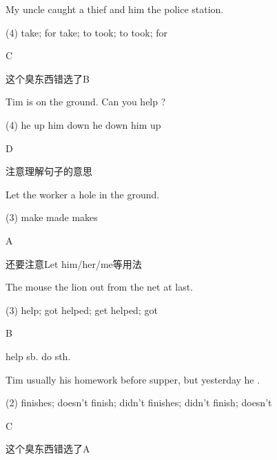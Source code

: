 \begin{question}[tags={xiaoxuect}]
My uncle caught a thief and \blank[width=1cm]{} him \blank[width=1cm]{} the police station.

  \begin{tasks}(4)
    \task take; for
    \task take; to
    \task took; to
    \task took; for
  \end{tasks}
\end{question}
\begin{solution}
C

这个臭东西错选了B
\end{solution}

\begin{question}[tags={xiaoxuect}]
Tim is on the ground. Can you help \blank[width=1cm]{} ?

  \begin{tasks}(4)
    \task he up
    \task him down
    \task he down
    \task him up
  \end{tasks}
\end{question}
\begin{solution}
D

注意理解句子的意思
\end{solution}


\begin{question}[tags={xiaoxuect}]
Let the worker \blank[width=1cm]{} a hole in the ground.

  \begin{tasks}(3)
    \task make
    \task made
    \task makes
  \end{tasks}
\end{question}
\begin{solution}
A

还要注意Let him/her/me等用法
\end{solution}

\begin{question}[tags={xiaoxuect}]
The mouse \blank[width=1cm]{} the lion \blank[width=1cm]{} out from the net at last.

  \begin{tasks}(3)
    \task help; got
    \task helped; get
    \task helped; got
  \end{tasks}
\end{question}
\begin{solution}
B

help sb. do sth.
\end{solution}

\begin{question}[tags={xiaoxuect}]
Tim usually \blank[width=1cm]{} his homework before supper, but yesterday he \blank[width=1cm]{}.

  \begin{tasks}(2)
    \task finishes; doesn't
    \task finish; didn't
    \task finishes; didn't
    \task finish; doesn't
  \end{tasks}
\end{question}
\begin{solution}
C

这个臭东西错选了A
\end{solution}


